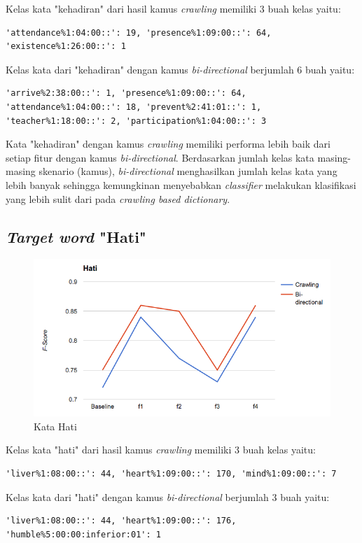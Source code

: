 Kelas kata "kehadiran" dari hasil kamus \textit{crawling} memiliki 3 buah kelas yaitu:
\begin{lstlisting}
'attendance%1:04:00::': 19, 'presence%1:09:00::': 64, 'existence%1:26:00::': 1
\end{lstlisting}
Kelas kata dari "kehadiran" dengan kamus \textit{bi-directional} berjumlah 6 buah yaitu:
\begin{lstlisting}
'arrive%2:38:00::': 1, 'presence%1:09:00::': 64, 'attendance%1:04:00::': 18, 'prevent%2:41:01::': 1, 'teacher%1:18:00::': 2, 'participation%1:04:00::': 3
\end{lstlisting}

Kata "kehadiran" dengan kamus \textit{crawling} memiliki performa lebih baik dari setiap fitur dengan kamus \textit{bi-directional}. Berdasarkan jumlah kelas kata masing-masing skenario (kamus), \textit{bi-directional} menghasilkan jumlah kelas kata yang lebih banyak sehingga kemungkinan menyebabkan \textit{classifier} melakukan klasifikasi yang lebih sulit dari pada \textit{crawling based dictionary}.

\subsection{\textit{Target word} "Hati"}

\begin{figure}
	\centering
	\includegraphics[width=1\linewidth]{adit_pics/hati.png}
	\caption{Kata Hati}
	\label{fig:hati}
\end{figure}

Kelas kata "hati" dari hasil kamus \textit{crawling} memiliki 3 buah kelas yaitu:
\begin{lstlisting}
'liver%1:08:00::': 44, 'heart%1:09:00::': 170, 'mind%1:09:00::': 7
\end{lstlisting}
Kelas kata dari "hati" dengan kamus \textit{bi-directional} berjumlah 3 buah yaitu:
\begin{lstlisting}
'liver%1:08:00::': 44, 'heart%1:09:00::': 176, 'humble%5:00:00:inferior:01': 1
\end{lstlisting}


